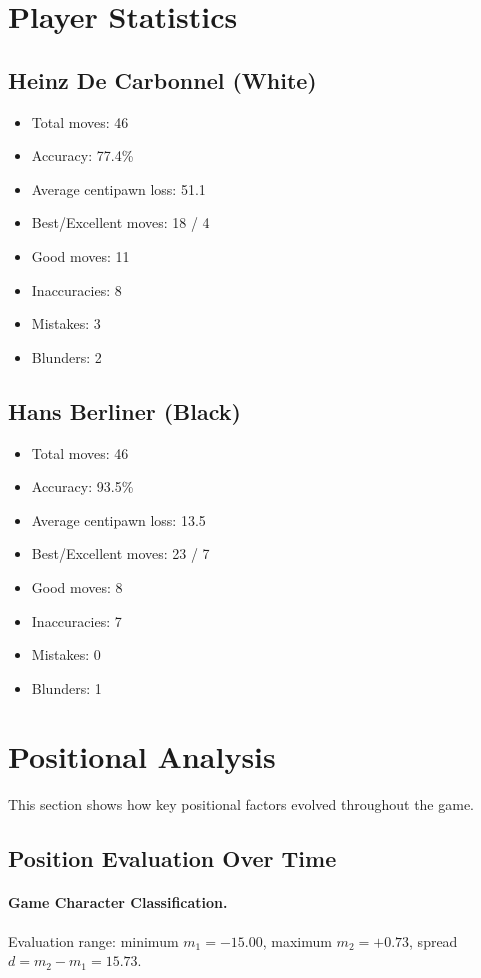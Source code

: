 \documentclass[11pt]{book}
\begin{document}
\section{Player Statistics}

\subsection{Heinz De Carbonnel (White)}
\begin{itemize}
\item Total moves: 46
\item Accuracy: 77.4\%
\item Average centipawn loss: 51.1
\item Best/Excellent moves: 18 / 4
\item Good moves: 11
\item Inaccuracies: 8
\item Mistakes: 3
\item Blunders: 2
\end{itemize}

\subsection{Hans Berliner (Black)}
\begin{itemize}
\item Total moves: 46
\item Accuracy: 93.5\%
\item Average centipawn loss: 13.5
\item Best/Excellent moves: 23 / 7
\item Good moves: 8
\item Inaccuracies: 7
\item Mistakes: 0
\item Blunders: 1
\end{itemize}

\section{Positional Analysis}

This section shows how key positional factors evolved throughout the game.

\subsection{Position Evaluation Over Time}

\paragraph{Game Character Classification.}
Evaluation range: minimum $m_1 = -15.00$, maximum $m_2 = +0.73$, spread $d = m_2 - m_1 = 15.73$.
\end{document}
